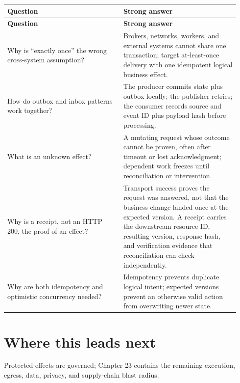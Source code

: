 \BookTableStart
\small
\begin{longtable}{@{}Y{0.4700\linewidth}Y{0.4700\linewidth}@{}}
\color{white}\bfseries \textbf{Question} & \color{white}\bfseries \textbf{Strong answer} \\
\endfirsthead
{}
\color{white}\bfseries \textbf{Question} & \color{white}\bfseries \textbf{Strong answer} \\
\endhead
Why is “exactly once” the wrong cross-system assumption? & Brokers, networks, workers, and external systems cannot share one transaction; target at-least-once delivery with one idempotent logical business effect. \\
How do outbox and inbox patterns work together? & The producer commits state plus outbox locally; the publisher retries; the consumer records source and event ID plus payload hash before processing. \\
What is an unknown effect? & A mutating request whose outcome cannot be proven, often after timeout or lost acknowledgment; dependent work freezes until reconciliation or intervention. \\
Why is a receipt, not an HTTP 200, the proof of an effect? & Transport success proves the request was answered, not that the business change landed once at the expected version. A receipt carries the downstream resource ID, resulting version, response hash, and verification evidence that reconciliation can check independently. \\
Why are both idempotency and optimistic concurrency needed? & Idempotency prevents duplicate logical intent; expected versions prevent an otherwise valid action from overwriting newer state. \\
\end{longtable}
\BookTableEnd

\section{Where this leads next}

Protected effects are governed; Chapter 23 contains the remaining execution, egress, data, privacy, and supply-chain blast radius.\par




